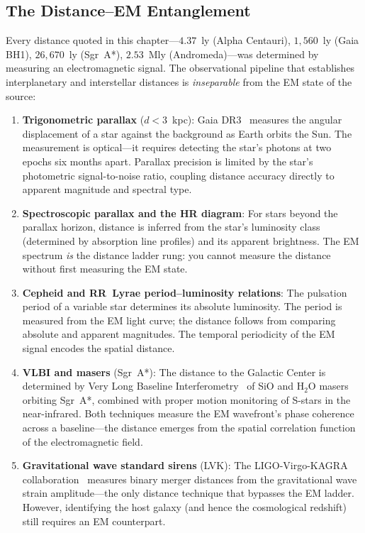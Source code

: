 \subsection{The Distance--EM Entanglement}

Every distance quoted in this chapter---$4.37$~ly (Alpha Centauri), $1{,}560$~ly (Gaia BH1), $26{,}670$~ly (Sgr~A*), $2.53$~Mly (Andromeda)---was determined by measuring an electromagnetic signal. The observational pipeline that establishes interplanetary and interstellar distances is \emph{inseparable} from the EM state of the source:

\begin{enumerate}[noitemsep]
    \item \textbf{Trigonometric parallax} ($d < 3$~kpc): Gaia DR3~\cite{NASAExoplanet} measures the angular displacement of a star against the background as Earth orbits the Sun. The measurement is optical---it requires detecting the star's photons at two epochs six months apart. Parallax precision is limited by the star's photometric signal-to-noise ratio, coupling distance accuracy directly to apparent magnitude and spectral type.
    \item \textbf{Spectroscopic parallax and the HR diagram}: For stars beyond the parallax horizon, distance is inferred from the star's luminosity class (determined by absorption line profiles) and its apparent brightness. The EM spectrum \emph{is} the distance ladder rung: you cannot measure the distance without first measuring the EM state.
    \item \textbf{Cepheid and RR~Lyrae period--luminosity relations}: The pulsation period of a variable star determines its absolute luminosity. The period is measured from the EM light curve; the distance follows from comparing absolute and apparent magnitudes. The temporal periodicity of the EM signal encodes the spatial distance.
    \item \textbf{VLBI and masers} (Sgr~A*): The distance to the Galactic Center is determined by Very Long Baseline Interferometry~\cite{NASAExoplanet} of SiO and H$_2$O masers orbiting Sgr~A*, combined with proper motion monitoring of S-stars in the near-infrared. Both techniques measure the EM wavefront's phase coherence across a baseline---the distance emerges from the spatial correlation function of the electromagnetic field.
    \item \textbf{Gravitational wave standard sirens} (LVK): The LIGO-Virgo-KAGRA collaboration~\cite{LVK_GWTC3} measures binary merger distances from the gravitational wave strain amplitude---the only distance technique that bypasses the EM ladder. However, identifying the host galaxy (and hence the cosmological redshift) still requires an EM counterpart.
\end{enumerate}

